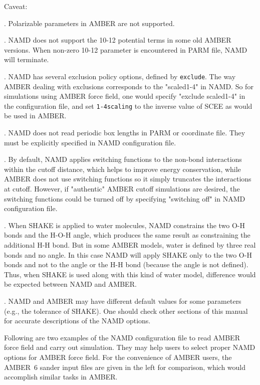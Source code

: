\noindent Caveat:

. Polarizable parameters in AMBER are not supported.

. NAMD does not support the 10-12 potential terms in
some old AMBER versions. When non-zero 10-12 parameter is
encountered in PARM file, NAMD will terminate.

. NAMD has several exclusion policy options, defined
by {\tt exclude}. The way AMBER dealing with exclusions
corresponds to the "scaled1-4" in NAMD. So for simulations using
AMBER force field, one would specify "exclude scaled1-4" in the
configuration file, and set {\tt 1-4scaling} to the inverse value
of SCEE as would be used in AMBER.

. NAMD does not read periodic box lengths in PARM or
coordinate file. They must be explicitly specified in NAMD
configuration file.

. By default, NAMD applies switching functions to
the non-bond interactions within the cutoff distance,
which helps to improve energy conservation, while AMBER does not
use switching functions so it simply
truncates the interactions at cutoff. However, if "authentic"
AMBER cutoff simulations are desired, the switching functions
could be turned off by specifying "switching off" in NAMD
configuration file.

. When SHAKE is applied to water molecules, NAMD
constrains the two O-H bonds and the H-O-H angle, which produces
the same result as constraining the additional H-H bond. But in
some AMBER models, water is defined by three real bonds and no
angle. In this case NAMD will apply SHAKE only to the two O-H
bonds and not to the angle or the H-H bond (because the angle is
not defined). Thus, when
SHAKE is used along with this kind of water model, difference
would be expected between NAMD and AMBER.

. NAMD and AMBER may have different default values for
some parameters (e.g., the tolerance of SHAKE). One should check
other sections of this manual for accurate descriptions
of the NAMD options.
\newline

Following are two examples of the NAMD configuration file to read
AMBER force field and carry out simulation. They may help users
to select proper NAMD options for AMBER force field. For the
convenience of AMBER users, the AMBER~6 sander input files are
given in the left for comparison, which would accomplish similar
tasks in AMBER.
\newline

